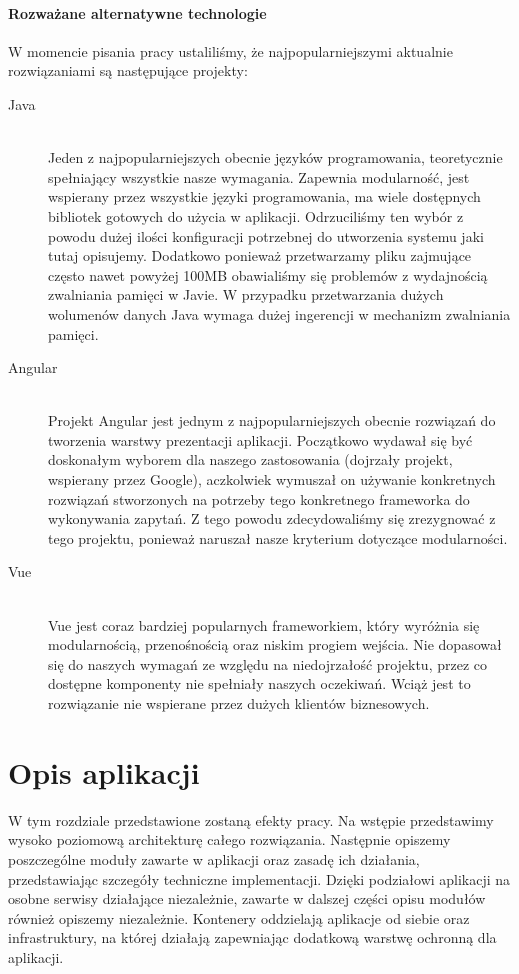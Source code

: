 \documentclass[a4paper,11pt,twoside]{report}
\theoremstyle{definition}
\begin{document}
\subsubsection{Rozważane alternatywne technologie}
W momencie pisania pracy ustaliliśmy, że najpopularniejszymi aktualnie rozwiązaniami są następujące projekty:
	  
\begin{description}
	\item [Java] \hfill \\
	Jeden z najpopularniejszych obecnie języków programowania, teoretycznie spełniający wszystkie nasze wymagania. Zapewnia modularność, jest wspierany przez wszystkie języki programowania, ma wiele dostępnych bibliotek gotowych do użycia w aplikacji. Odrzuciliśmy ten wybór z powodu dużej ilości konfiguracji potrzebnej do utworzenia systemu jaki tutaj opisujemy. Dodatkowo ponieważ przetwarzamy pliku zajmujące często nawet powyżej 100MB obawialiśmy się problemów z wydajnością zwalniania pamięci w Javie. W przypadku przetwarzania dużych wolumenów danych Java wymaga dużej ingerencji w mechanizm zwalniania pamięci.
\item[Angular] \hfill \\
  	Projekt Angular jest jednym z najpopularniejszych obecnie rozwiązań do tworzenia warstwy prezentacji aplikacji. Początkowo wydawał się być doskonałym wyborem dla naszego zastosowania (dojrzały projekt, wspierany przez Google), aczkolwiek wymuszał on używanie konkretnych rozwiązań stworzonych na potrzeby tego konkretnego frameworka do wykonywania zapytań. Z tego powodu zdecydowaliśmy się zrezygnować z tego projektu, ponieważ naruszał nasze kryterium dotyczące modularności.
\item[Vue] \hfill \\
	Vue jest coraz bardziej popularnych frameworkiem, który wyróżnia się modularnością, przenośnością oraz niskim progiem wejścia. Nie dopasował się do naszych wymagań ze względu na niedojrzałość projektu, przez co dostępne komponenty nie spełniały naszych oczekiwań. Wciąż jest to rozwiązanie nie wspierane przez dużych klientów biznesowych.
\end{description}

\chapter{Opis aplikacji}
W tym rozdziale przedstawione zostaną efekty pracy. Na wstępie przedstawimy wysoko poziomową architekturę całego rozwiązania. Następnie opiszemy poszczególne moduły zawarte w aplikacji oraz zasadę ich działania, przedstawiając szczegóły techniczne implementacji. Dzięki podziałowi aplikacji na osobne serwisy działające niezależnie, zawarte w dalszej części opisu modułów również opiszemy niezależnie. Kontenery oddzielają aplikacje od siebie oraz infrastruktury, na której działają zapewniając dodatkową warstwę ochronną dla aplikacji.
\end{document}
